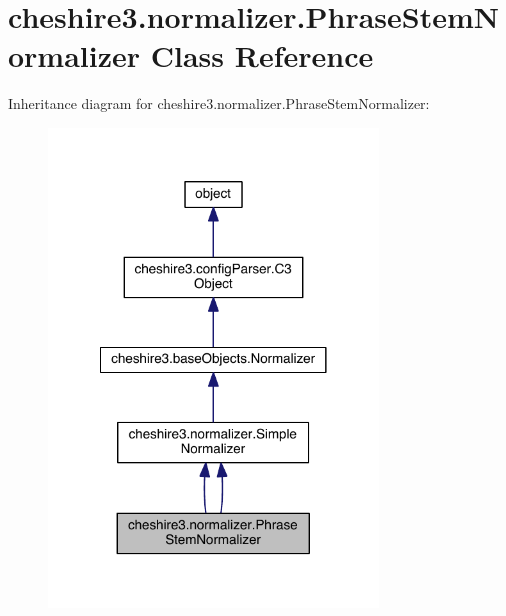 \hypertarget{classcheshire3_1_1normalizer_1_1_phrase_stem_normalizer}{\section{cheshire3.\-normalizer.\-Phrase\-Stem\-Normalizer Class Reference}
\label{classcheshire3_1_1normalizer_1_1_phrase_stem_normalizer}
}


Inheritance diagram for cheshire3.\-normalizer.\-Phrase\-Stem\-Normalizer\-:
\nopagebreak
\begin{figure}[H]
\begin{center}
\leavevmode
\includegraphics[width=248pt]{classcheshire3_1_1normalizer_1_1_phrase_stem_normalizer__inherit__graph}
\end{center}
\end{figure}


